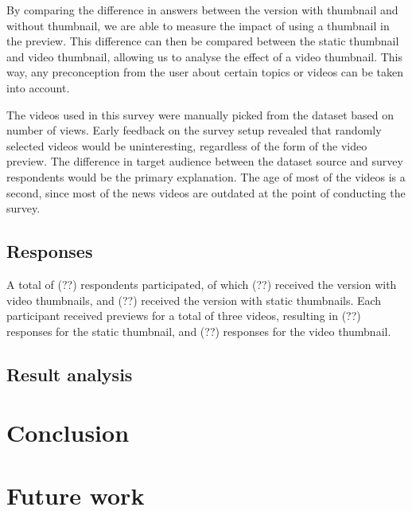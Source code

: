 \documentclass{../resources/acm_proc_article-sp}
\begin{document}
By comparing the difference in answers between the version with thumbnail and without thumbnail, we are able to measure the impact of using a thumbnail in the preview. This difference can then be compared between the static thumbnail and video thumbnail, allowing us to analyse the effect of a video thumbnail. This way, any preconception from the user about certain topics or videos can be taken into account.

The videos used in this survey were manually picked from the dataset based on number of views. Early feedback on the survey setup revealed that randomly selected videos would be uninteresting, regardless of the form of the video preview. The difference in target audience between the dataset source and survey respondents would be the primary explanation. The age of most of the videos is a second, since most of the news videos are outdated at the point of conducting the survey.

\subsection{Responses}

A total of (??) respondents participated, of which (??) received the version with video thumbnails, and (??) received the version with static thumbnails. Each participant received previews for a total of three videos, resulting in (??) responses for the static thumbnail, and (??) responses for the video thumbnail.

\subsection{Result analysis}

\section{Conclusion}

\section{Future work}
\end{document}
